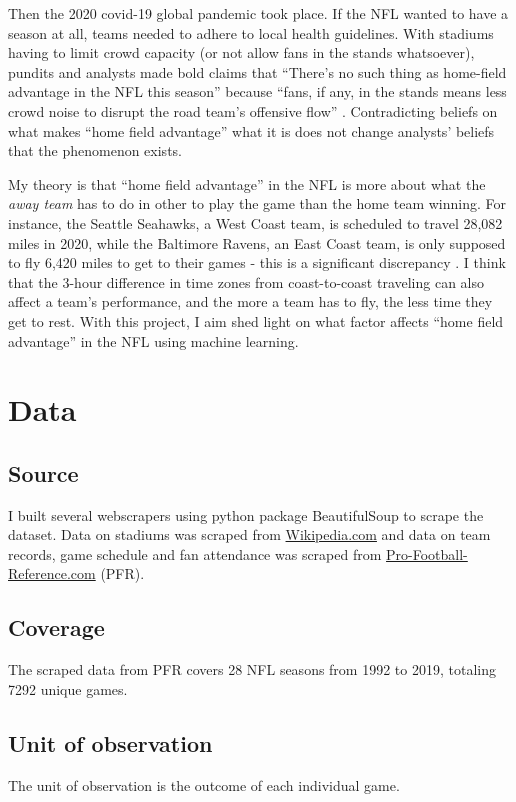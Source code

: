 \documentclass[12pt, letterpaper, twoside]{article}
\begin{document}
Then the 2020 covid-19 global pandemic took place. If the NFL wanted to have a season at all, teams needed to adhere to local health guidelines. With stadiums having to limit crowd capacity (or not allow fans in the stands whatsoever), pundits and analysts made bold claims that ``There's no such thing as home-field advantage in the NFL this season'' because ``fans, if any, in the stands means less crowd noise to disrupt the road team's offensive flow'' \citep{wapo}. Contradicting beliefs on what makes ``home field advantage'' what it is does not change analysts' beliefs that the phenomenon exists. 

My theory is that ``home field advantage'' in the NFL is more about what the \textit{away team} has to do in other to play the game than the home team winning. For instance, the Seattle Seahawks, a West Coast team, is scheduled to travel 28,082 miles in 2020, while the Baltimore Ravens, an East Coast team, is only supposed to fly 6,420 miles to get to their games - this is a significant discrepancy \citep{cbs}. I think that the 3-hour difference in time zones from coast-to-coast traveling can also affect a team's performance, and the more a team has to fly, the less time they get to rest. With this project, I aim shed light on what factor affects ``home field advantage'' in the NFL using machine learning. 

\section{Data}

\subsection{Source}
I built several webscrapers using python package BeautifulSoup \citep{soup} to scrape the dataset. Data on stadiums was scraped from \url{Wikipedia.com} and data on team records, game schedule and fan attendance was scraped from \url{Pro-Football-Reference.com} (PFR). 

\subsection{Coverage}
The scraped data from PFR covers 28 NFL seasons from 1992 to 2019, totaling 7292 unique games. 

\subsection{Unit of observation}
The unit of observation is the outcome of each individual game. 
\end{document}
